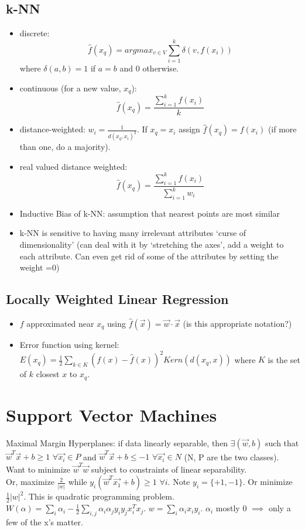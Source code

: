 \documentclass[11pt]{article}
\begin{document}
\subsection{k-NN}
\begin{itemize}
\item discrete: $$\hat{f} (x_q) =argmax_{v \in V} \sum_{i=1}^k{\delta(v, f(x_i))}$$ where $\delta(a,b) =1$ if $a=b$ and $0$ otherwise.
\item continuous (for a new value, $x_q$): $$\hat{f} (x_q) = \frac{\sum_{i=1}^{k}{f(x_i)}}{k}$$
\item distance-weighted: $w_i = \frac{1}{d(x_q, x_i)^2}$. If $x_q = x_i$ assign $\hat{f} (x_q) = f(x_i)$ (if more than one, do a majority).
\item real valued distance weighted: $$\hat{f} (x_q) = \frac{\sum_{i=1}^{k}{f(x_i)}}{\sum_{i=1}^{k}{w_i}}$$
\item  Inductive Bias of k-NN: assumption that nearest points are most similar
\item k-NN is sensitive to having many irrelevant attributes `curse of dimensionality' (can deal with it by `stretching the axes', add a weight to each attribute. Can even get rid of some of the attributes by setting the weight =0)
\end{itemize}

\subsection{Locally Weighted Linear Regression}
\begin{itemize}
\item $f$ approximated near $x_q$ using $\hat{f}(\vec{x}) = \vec{w} \cdot \vec{x}$ (is this appropriate notation?)
\item Error function using kernel: $E(x_q) = \frac12 \sum_{k\in K}{(f(x) - \hat{f}(x))^2 Kern(d(x_q, x))}$ where $K$ is the set of $k$ closest $x$ to $x_q$.
\end{itemize}

\section{Support Vector Machines}
Maximal Margin Hyperplanes: if data linearly separable, then $\exists (\vec{w}, b)$ such that $\vec{w}^T\vec{x} + b \geq 1$ $\forall \vec{x_i} \in P$ and $\vec{w}^T\vec{x} + b \leq -1$ $\forall \vec{x_i} \in N$ (N, P are the two classes). Want to minimize $\vec{w}^T\vec{w}$ subject to constraints of linear separability.\\ Or, maximize $\frac2{|w|}$ while $y_i(\vec{w}^T\vec{x_1}+b) \geq 1$ $\forall i$. Note $y_i =\{+1, -1\}$. Or minimize $\frac12 |w|^2$. This is quadratic programming problem.\\
$W(\alpha) = \sum_{i} \alpha_i - \frac12 \sum_{i,j} \alpha_i \alpha_j y_i y_j x_i^T x_j$. $w = \sum_i \alpha_i x_i y_i$. $\alpha_i$ mostly 0 $\implies$ only a few of the x's matter.
\end{document}
